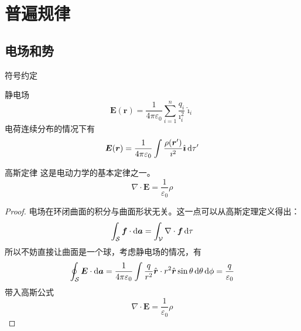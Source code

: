 \documentclass{mynote}
\begin{document}
\section{普遍规律}
\subsection{电场和势}
符号约定
\begin{center}
\end{center}

\begin{define}{静电场}
    \[
    \bm{E}(\bm{r}) = \frac{1}{4\pi \varepsilon_0} \sum_{i=1}^n \frac{q_i}{\imath_i^2} \hat{\bm{\imath}}_i    
    \]
    电荷连续分布的情况下有
    \[
    \boldsymbol{E}(\boldsymbol{r}) = \frac{1}{4\pi \varepsilon_0} \int \frac{\rho (\boldsymbol{r}')}{\imath^2} \hat{\boldsymbol{\imath}} \mathop{}\!\mathrm{d} \tau'
    \]
\end{define}





\begin{theorem}{高斯定律}
    这是电动力学的基本定律之一。
    \[
    \boxed{
    \nabla \cdot \bm{E} = \frac{1}{\varepsilon_0} \rho   } 
    \]
\end{theorem}
\begin{proof}
    电场在环闭曲面的积分与曲面形状无关。这一点可以从高斯定理定义得出：
    \[
    \int_{\mathcal{S}} \boldsymbol{f} \cdot \mathop{}\!\mathrm{d} \boldsymbol{a} = \int_{\mathcal{V}} \nabla \cdot \boldsymbol{f} \mathop{}\!\mathrm{d} \tau    
    \]
    所以不妨直接让曲面是一个球，考虑静电场的情况，有
    \[
    \oint_{\mathcal{S}} \boldsymbol{E}\cdot \mathop{}\!\mathrm{d} \boldsymbol{a} = \frac{1}{4\pi \varepsilon_0} \int \frac{q}{r^2} \hat{\boldsymbol{r}} \cdot r^2 \hat{\boldsymbol{r}} \sin \theta \mathop{}\!\mathrm{d} \theta \mathop{}\!\mathrm{d} \phi  = \frac{q}{\varepsilon_0}  
    \]
    带入高斯公式
    \[
    \nabla \cdot \bm{E} = \frac{1}{\varepsilon_0} \rho    
    \]
\end{proof}
\end{document}
